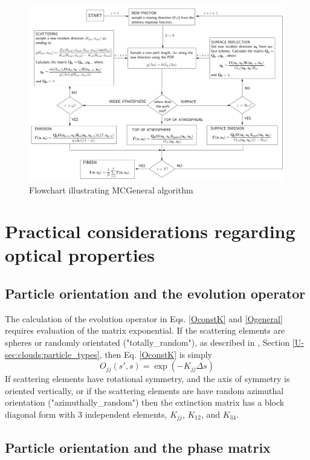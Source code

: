 \begin{figure}
\begin{center}
\includegraphics[width=\vsize,angle=90]{flowchart2}
\caption{Flowchart illustrating MCGeneral algorithm}
\end{center}
\label{fig:montecarlo:flowchart}
\end{figure}

\section{Practical considerations regarding optical properties}
\subsection{Particle orientation and the evolution operator}
The calculation of the evolution operator in Eqs. \ref{OconstK} and
\ref{Ogeneral} requires evaluation of the matrix exponential.  If the scattering
elements are spheres or randomly orientated ("totally\_random"), as described in
\user, Section \ref{U-sec:clouds:particle_types}, then Eq. \ref{OconstK} is simply
\begin{equation}
O_{jj}(s',s)=\exp\left(-K_{jj}\Delta s\right)
\label{OconstKp1020}
\end{equation}
If scattering elements have rotational symmetry, and the axis of symmetry is
oriented vertically, or if the scattering elements are have random azimuthal orientation
("azimuthally\_random") then the extinction matrix has a block diagonal form with 3 independent
elements, $K_{jj}$, $K_{12}$, and $K_{34}$.

\subsection{Particle orientation and the phase matrix}
